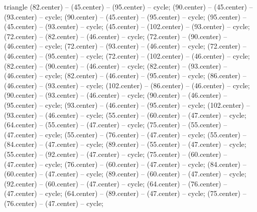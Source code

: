 \begin{pgfonlayer}{triangle}
 (82.center) -- (45.center) -- (95.center) -- cycle; 
 (90.center) -- (45.center) -- (93.center) -- cycle; 
 (90.center) -- (45.center) -- (95.center) -- cycle; 
 (95.center) -- (45.center) -- (93.center) -- cycle; 
 (45.center) -- (102.center) -- (93.center) -- cycle; 
 (72.center) -- (82.center) -- (46.center) -- cycle; 
 (72.center) -- (90.center) -- (46.center) -- cycle; 
 (72.center) -- (93.center) -- (46.center) -- cycle; 
 (72.center) -- (46.center) -- (95.center) -- cycle; 
 (72.center) -- (102.center) -- (46.center) -- cycle; 
 (82.center) -- (90.center) -- (46.center) -- cycle; 
 (82.center) -- (93.center) -- (46.center) -- cycle; 
 (82.center) -- (46.center) -- (95.center) -- cycle; 
 (86.center) -- (46.center) -- (93.center) -- cycle; 
 (102.center) -- (86.center) -- (46.center) -- cycle; 
 (90.center) -- (93.center) -- (46.center) -- cycle; 
 (90.center) -- (46.center) -- (95.center) -- cycle; 
 (93.center) -- (46.center) -- (95.center) -- cycle; 
 (102.center) -- (93.center) -- (46.center) -- cycle; 
 (55.center) -- (60.center) -- (47.center) -- cycle; 
 (64.center) -- (55.center) -- (47.center) -- cycle; 
 (75.center) -- (55.center) -- (47.center) -- cycle; 
 (55.center) -- (76.center) -- (47.center) -- cycle; 
 (55.center) -- (84.center) -- (47.center) -- cycle; 
 (89.center) -- (55.center) -- (47.center) -- cycle; 
 (55.center) -- (92.center) -- (47.center) -- cycle; 
 (75.center) -- (60.center) -- (47.center) -- cycle; 
 (76.center) -- (60.center) -- (47.center) -- cycle; 
 (84.center) -- (60.center) -- (47.center) -- cycle; 
 (89.center) -- (60.center) -- (47.center) -- cycle; 
 (92.center) -- (60.center) -- (47.center) -- cycle; 
 (64.center) -- (76.center) -- (47.center) -- cycle; 
 (64.center) -- (89.center) -- (47.center) -- cycle; 
 (75.center) -- (76.center) -- (47.center) -- cycle; 

\end{pgfonlayer}
